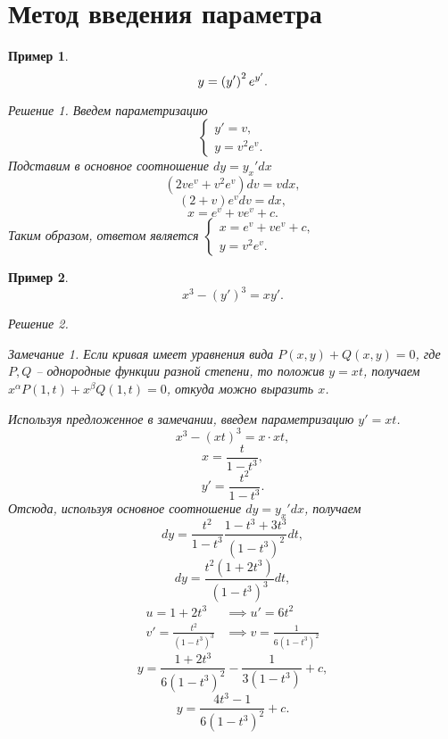 \documentclass[a5paper, 11pt]{article}
\theoremstyle{definition}
\theoremstyle{plain}
\newtheorem{Ex}{Пример}
\theoremstyle{remark}
\newtheorem*{Note}{Замечание}
\newtheorem*{Solution}{Решение}
\begin{document}
	\section[07.10.2022]{Метод введения параметра}
	\begin{Ex}
		\[
		y=\left(y'\right)^2e^{y'}.
		\]
		\begin{Solution}
			Введем параметризацию
			\[
			\begin{cases}
				y'=v,\\
				y = v^2 e^v.
			\end{cases}
			\]
			Подставим в основное соотношение $dy = y_x' dx$
			\[
			(2ve^v + v^2 e^v)dv = v dx,
			\]
			\[
			(2+v)e^vdv = dx,
			\]
			\[
			x = e^v + ve^v + c.
			\]
			Таким образом, ответом является $\begin{cases}
				x = e^v + ve^v + c,\\
				y = v^2 e^v.
			\end{cases}$
		\end{Solution}
	\end{Ex}

	\begin{Ex}
		\[
		x^3 - (y')^3 = xy'.
		\]
		\begin{Solution}
			\begin{Note}
				Если кривая имеет уравнения вида $P(x,y) + Q(x,y) = 0$, где $P,Q$ -- однородные функции разной степени, то положив $y=xt$, получаем $x^{\alpha} P(1,t) + x^\beta Q(1,t) = 0$, откуда можно выразить $x$.
			\end{Note}
			Используя предложенное в замечании, введем параметризацию $y' = xt$.
			\[
			x^3 - (xt)^3 = x \cdot xt,
			\]
			\[
			x = \frac{t}{1-t^3},
			\]
			\[
			y'= \frac{t^2}{1-t^3}.
			\]
			Отсюда, используя основное соотношение $dy = y_x' dx$, получаем
			\[
			dy = \frac{t^2}{1-t^3} \frac{1-t^3 + 3t^3}{(1-t^3)^2}dt,
			\]
			\[
			dy = \frac{t^2(1+2t^3)}{(1-t^3)^3}dt,
			\]
			\[
			\begin{split}
				u = 1+2t^3 &\implies u' = 6t^2\\
				v' = \frac{t^2}{(1-t^3)^3} &\implies v = \frac{1}{6(1-t^3)^2}
 			\end{split}
			\]
			\[
			y = \frac{1+2t^3}{6(1-t^3)^2} - \frac{1}{3(1-t^3)} + c,
			\]
			\[
			y= \frac{4t^3-1}{6(1-t^3)^2}+c.
			\]
		\end{Solution}
	\end{Ex}
	
\end{document}
